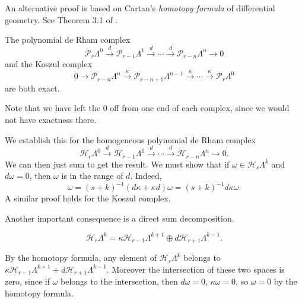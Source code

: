\begin{Remark}\label{rem:koszul-cartan-proof}
{An alternative proof is based on Cartan's \emph{homotopy formula} of differential geometry. See Theorem 3.1 of .}
\end{Remark}

\begin{Corollary}\label{cor:polynomial-de-rham-exactness}
{The polynomial de Rham complex}
\[
\mathcal P_r\Lambda^0\xrightarrow{d}\mathcal P_{r-1}\Lambda^1\xrightarrow{d}\cdots\xrightarrow{d}\mathcal P_{r-n}\Lambda^n\to0
\]
{and the Koszul complex}
\[
0\to\mathcal P_{r-n}\Lambda^n\xrightarrow{\kappa}\mathcal P_{r-n+1}\Lambda^{n-1}\xrightarrow{\kappa}\cdots\xrightarrow{\kappa}\mathcal P_r\Lambda^0
\]
{are both exact.}
\end{Corollary}

{Note that we have left the $0$ off from one end of each complex, since we would not have exactness there.}

\begin{Proof}
{We establish this for the homogeneous polynomial de Rham complex}
\[
\mathcal H_r\Lambda^0\xrightarrow{d}\mathcal H_{r-1}\Lambda^1\xrightarrow{d}\cdots\xrightarrow{d}\mathcal H_{r-n}\Lambda^n\to0.
\]
{We can then just sum to get the result. We must show that if $\omega\in\mathcal H_s\Lambda^k$ and $d\omega=0$, then $\omega$ is in the range of $d$. Indeed,}
\[
\omega=(s+k)^{-1}(d\kappa+\kappa d)\omega=(s+k)^{-1}d\kappa\omega.
\]
{A similar proof holds for the Koszul complex.}
\end{Proof}

{Another important consequence is a direct sum decomposition.}

\begin{Corollary}\label{cor:homogeneous-koszul-decomposition}
\begin{equation}\label{eq:homogeneous-koszul-decomposition}
\mathcal H_r\Lambda^k=\kappa\mathcal H_{r-1}\Lambda^{k+1}\oplus d\mathcal H_{r+1}\Lambda^{k-1}.
\end{equation}
\end{Corollary}

\begin{Proof}
{By the homotopy formula, any element of $\mathcal H_r\Lambda^k$ belongs to $\kappa\mathcal H_{r-1}\Lambda^{k+1}+d\mathcal H_{r+1}\Lambda^{k-1}$. Moreover the intersection of these two spaces is zero, since if $\omega$ belongs to the intersection, then $d\omega=0$, $\kappa\omega=0$, so $\omega=0$ by the homotopy formula.}
\end{Proof}

